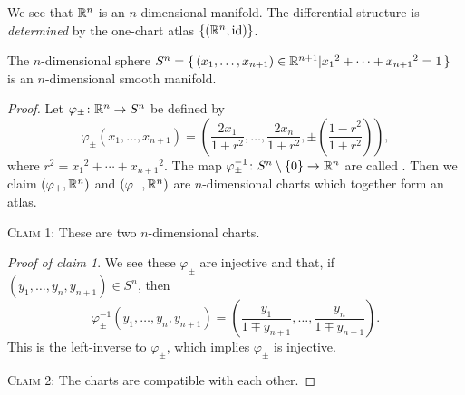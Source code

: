 \begin{example}
We see that $\mathbb{R}^{n}$ is an $n$-dimensional manifold. The differential
structure is \emph{determined} by the one-chart atlas $\{(\mathbb{R}^{n},\operatorname{id})\}$.
\end{example}

\begin{example}
The $n$-dimensional sphere $S^{n}=\{\,(x_{1},\dots,x_{n+1})\in\mathbb{R}^{n+1}|{x_{1}}^{2}+\cdots+{x_{n+1}}^{2}=1\,\}$
is an $n$-dimensional smooth manifold.
\end{example}

\begin{proof}
  Let $\varphi_{\pm}\colon\mathbb{R}^{n}\to S^{n}$ be defined by
  \begin{equation}
\varphi_{\pm}(x_{1},\dots,x_{n+1}) = \left(\frac{2x_{1}}{1+r^{2}},
\dots, \frac{2x_{n}}{1+r^{2}}, \pm\left(\frac{1-r^{2}}{1+r^{2}}\right)\right),
  \end{equation}
  where $r^{2} = {x_{1}}^{2}+\cdots+{x_{n+1}}^{2}$. The map
  $\varphi_{\pm}^{-1}\colon S^{n}\setminus\{0\}\to\mathbb{R}^{n}$ are called
  .
  Then we claim $(\varphi_{+},\mathbb{R}^{n})$ and $(\varphi_{-},\mathbb{R}^{n})$ are
  $n$-dimensional charts which together form an atlas.

\smallbreak
  \textsc{Claim 1:} These are two $n$-dimensional charts.

\noindent\textit{Proof of claim 1}.
  We see these $\varphi_{\pm}$ are injective and that, if
  $(y_{1},\dots,y_{n},y_{n+1})\in S^{n}$, then
  \begin{equation}
\varphi_{\pm}^{-1}(y_{1},\dots,y_{n},y_{n+1}) = \left(\frac{y_{1}}{1 \mp y_{n+1}},\dots,\frac{y_{n}}{1 \mp y_{n+1}}\right).
  \end{equation}
  This is the left-inverse to $\varphi_{\pm}$, which implies
  $\varphi_{\pm}$ is injective.

\smallbreak
  \textsc{Claim 2:} The charts are compatible with each other.


\end{proof}

